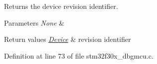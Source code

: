 Returns the device revision identifier. 


\begin{DoxyParams}{Parameters}
{\em None} & \\
\hline
\end{DoxyParams}

\begin{DoxyRetVals}{Return values}
{\em \hyperlink{struct_device}{Device}} & revision identifier \\
\hline
\end{DoxyRetVals}


Definition at line 73 of file stm32f30x\-\_\-dbgmcu.\-c.

